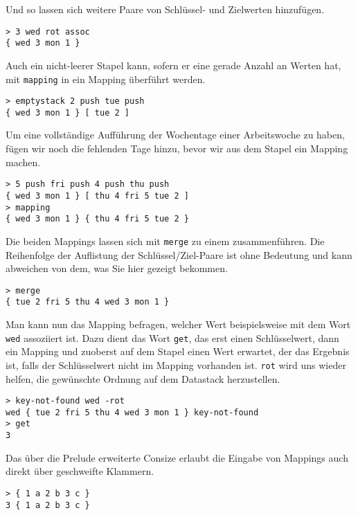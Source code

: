 Und so lassen sich weitere Paare von Schlüssel- und Zielwerten hinzufügen.

\begin{verbatim}
> 3 wed rot assoc
{ wed 3 mon 1 }
\end{verbatim} 

Auch ein nicht-leerer Stapel kann, sofern er eine gerade Anzahl an Werten hat, mit \verb|mapping| in ein Mapping überführt werden.

\begin{verbatim}
> emptystack 2 push tue push
{ wed 3 mon 1 } [ tue 2 ]
\end{verbatim}

Um eine vollständige Aufführung der Wochentage einer Arbeitswoche zu haben, fügen wir noch die fehlenden Tage hinzu, bevor wir aus dem Stapel ein Mapping machen.

\begin{verbatim}
> 5 push fri push 4 push thu push
{ wed 3 mon 1 } [ thu 4 fri 5 tue 2 ]
> mapping
{ wed 3 mon 1 } { thu 4 fri 5 tue 2 }
\end{verbatim}

Die beiden Mappings lassen sich mit \verb|merge| zu einem zusammenführen. Die Reihenfolge der Auflistung der Schlüssel\slash Ziel-Paare ist ohne Bedeutung und kann abweichen von dem, was Sie hier gezeigt bekommen.

\begin{verbatim}
> merge
{ tue 2 fri 5 thu 4 wed 3 mon 1 }
\end{verbatim}

Man kann nun das Mapping befragen, welcher Wert beispielsweise mit dem Wort \verb|wed| assoziiert ist. Dazu dient das Wort \verb|get|, das erst einen Schlüsselwert, dann ein Mapping und zuoberst auf dem Stapel einen Wert erwartet, der das Ergebnis ist, falls der Schlüsselwert nicht im Mapping vorhanden ist. \verb|rot| wird uns wieder helfen, die gewünschte Ordnung auf dem Datastack herzustellen.

\begin{verbatim}
> key-not-found wed -rot
wed { tue 2 fri 5 thu 4 wed 3 mon 1 } key-not-found
> get
3
\end{verbatim}

Das über die Prelude erweiterte Consize erlaubt die Eingabe von Mappings auch direkt über geschweifte Klammern.

\begin{verbatim}
> { 1 a 2 b 3 c }
3 { 1 a 2 b 3 c }
\end{verbatim}

